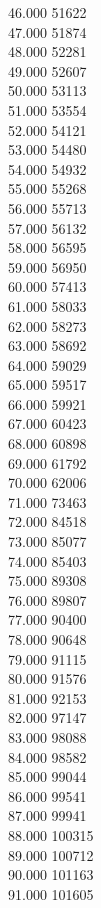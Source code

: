 { 46.000	51622 \\
 47.000	51874 \\
 48.000	52281 \\
 49.000	52607 \\
 50.000	53113 \\
 51.000	53554 \\
 52.000	54121 \\
 53.000	54480 \\
 54.000	54932 \\
 55.000	55268 \\
 56.000	55713 \\
 57.000	56132 \\
 58.000	56595 \\
 59.000	56950 \\
 60.000	57413 \\
 61.000	58033 \\
 62.000	58273 \\
 63.000	58692 \\
 64.000	59029 \\
 65.000	59517 \\
 66.000	59921 \\
 67.000	60423 \\
 68.000	60898 \\
 69.000	61792 \\
 70.000	62006 \\
 71.000	73463 \\
 72.000	84518 \\
 73.000	85077 \\
 74.000	85403 \\
 75.000	89308 \\
 76.000	89807 \\
 77.000	90400 \\
 78.000	90648 \\
 79.000	91115 \\
 80.000	91576 \\
 81.000	92153 \\
 82.000	97147 \\
 83.000	98088 \\
 84.000	98582 \\
 85.000	99044 \\
 86.000	99541 \\
 87.000	99941 \\
 88.000	100315 \\
 89.000	100712 \\
 90.000	101163 \\
 91.000	101605 \\
}
